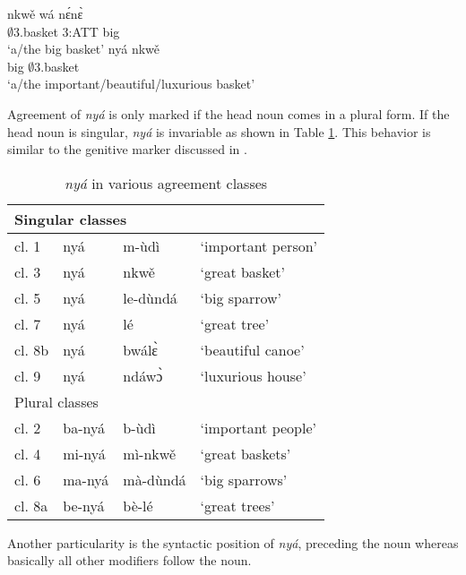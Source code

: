 \begin{exe}
\ex\label{nya}
\begin{xlist}
\ex\label{nya1}
 \gll  nkwě wá nɛ́nɛ̀\\
          $\emptyset$3.basket 3:ATT big \\
    \trans `a/the big basket'
\ex \label{nya2}
  \gll   nyá nkwě \\
             big $\emptyset$3.basket \\
    \trans `a/the important/beautiful/luxurious basket'
\end {xlist}
\end {exe}



Agreement of {\itshape nyá}  is only marked if the head noun comes in a plural form. If the head noun is singular, {\itshape nyá} is invariable as shown in Table \ref{Tab:nya}. This behavior is similar to the genitive marker discussed in . 

\begin{table} 
\centering
\begin{tabular}{llll}
 \midrule
\multicolumn{4}{l}{Singular classes} \\
 \midrule
cl. 1 & nyá & m-ùdì & `important person'  \\
cl. 3 & nyá & nkwě  & `great basket'        \\
cl. 5 & nyá & le-dùndá & `big sparrow'      \\
cl. 7 & nyá & lé       & `great tree'            \\
cl. 8b & nyá & bwálɛ̀ & `beautiful canoe'  \\
cl. 9 & nyá &   ndáwɔ̀ & `luxurious house'   \\
 \midrule
\multicolumn{4}{l}{Plural classes} \\
 \midrule
cl. 2 & ba-nyá & b-ùdì & `important people' \\
cl. 4 & mi-nyá & mì-nkwě & `great baskets'  \\
cl. 6 & ma-nyá & mà-dùndá & `big sparrows' \\
cl. 8a & be-nyá & bè-lé & `great trees' \\
 \midrule
\end{tabular}
\caption{{\itshape nyá} in various agreement classes}
\label{Tab:nya}
\end{table}

\noindent Another particularity is the syntactic position of {\itshape nyá}, preceding the noun whereas basically all other modifiers follow the noun.











